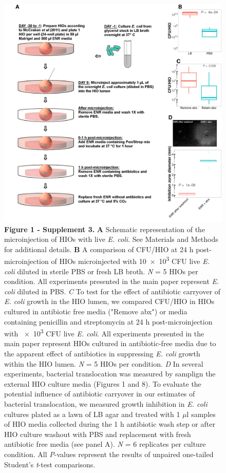 \documentclass[9pt,lineo]{elife}
\begin{document}
\begin{figure}
\begin{fullwidth}
\centering\includegraphics[width=0.85\linewidth]{./figures/figure1/sfigure1-3_multipanel.pdf}
\caption*{\textbf{Figure 1 - Supplement 3. } \textbf{A} Schematic representation of the microinjection of HIOs with live \textit{E. coli}. See Materials and Methods for additional details. \textbf{B} A comparison of CFU/HIO at 24 h post-microinjection of HIOs microinjected with \num{10e3} CFU live \textit{E. coli} diluted in sterile PBS or fresh LB broth. \textit{N} = 5 HIOs per condition. All experiments presented in the main paper represent \textit{E. coli} diluted in PBS. \textit{C} To test for the effect of antibiotic carryover of \textit{E. coli} growth in the HIO lumen, we compared CFU/HIO in HIOs cultured in antibiotic free media ("Remove abx") or media containing penicillin and streptomycin at 24 h post-microinjection with \num{e3} CFU live \textit{E. coli}. All experiments presented in the main paper represent HIOs cultured in antibiotic-free media due to the apparent effect of antibiotics in suppressing \textit{E. coli} growth within the HIO lumen. \textit{N} = 5 HIOs per condition. \textit{D} In several experiments, bacterial translocation was measured by samplign the external HIO culture media (Figures 1 and 8). To evaluate the potential influence of antibiotic carryover in our estimates of bacterial translocation, we measured growth inhibition in \textit{E. coli} cultures plated as a lawn of LB agar and treated with 1 $\mu$l samples of HIO media collected during the 1 h antibiotic wash step or after HIO culture washout with PBS and replacement with fresh antibiotic free media (see panel A). \textit{N} = 6 replicates per culture condition. All \textit{P}-values represent the results of unpaired one-tailed Student's \textit{t}-test comparisons.}
\label{fig:fullwidth}
\end{fullwidth}
\end{figure}
\end{document}
